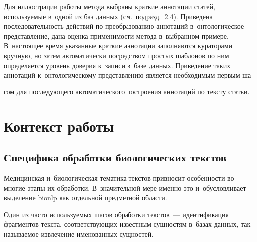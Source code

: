 \begin{multicols}{2}
  Для иллюстрации работы метода выбраны краткие аннотации статей, 
используемые в~одной из баз данных (см.\ подразд.~2.4). Приведена 
последовательность действий по преобразованию аннотаций в~онтологическое 
представление, дана оценка применимости метода в~выбранном примере. 
В~насто\-ящее время указанные краткие аннотации заполняются кураторами 
вручную, но затем автоматически посредством простых шаблонов по ним 
определяется уровень доверия к~записи в~базе данных. Приведение таких 
аннотаций к~онтологическому представлению является необходимым первым 
ша-\linebreak\vspace*{-12pt}

\pagebreak

\noindent
гом для последующего автоматического постро\-ения аннотаций по тексту 
статьи.

\vspace*{-6pt}
  
  \section{Контекст работы}
  
  \vspace*{-3pt}
  
  \subsection{Специфика обработки биологических текстов}
  
  \vspace*{-1pt}
  
  Медицинская и~биологическая тематика текстов привносит особенности во 
многие этапы их обработки. В~значительной мере именно это и~обуслов\-ливает 
выделение bionlp как отдельной предметной области.
  
  Один из часто используемых шагов обработки текстов~--- идентификация 
фрагментов текста, соответствующих известным сущностям в~базах данных, 
так называемое извлечение именованных сущностей.
{

}
  

\end{multicols}
